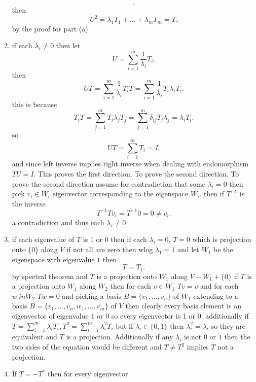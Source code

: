 \documentclass{article}
\begin{document}
\begin{enumerate}[label = (\alph*)]
\[                .\] 
                then
                \[
                U^2 = \lambda_1T_1 + ... + \lambda_mT_m = T
                .\] 
                by the proof for part (a)
            \item if each $\lambda_i \ne 0$ then let
                \[
                U = \sum_{i=1}^{m}\frac{1}{\lambda_i}T_i
                .\] 
                then
                \[
                UT = \sum_{i=1}^{m}\frac{1}{\lambda_i}T_iT = \sum_{i=1}^{m}\frac{1}{\lambda_i}T_i\lambda_iT_i
                .\] 
                this is because
                \[
                    T_iT = \sum_{j=1}^{m}T_i\lambda_jT_j = \sum_{j=1}^{m}\delta_{ij}T_i\lambda_j = \lambda_iT_i
                .\] 
                so
                \[
                UT = \sum_{i=1}^{m}T_i = I
                .\] 
                and since left inverse implies right inverse when dealing with endomorphism $TU = I$.
                This proves the first direction. To prove the second direction. To prove the second direction assume for contradiction that some $\lambda_i = 0$ then pick $v_i \in W_i$ eigenvector corresponding to the eigenspace  $W_i$.
                then if $T^{-1}$ is the inverse
                \[
                T^{-1}Tv_i = T^{-1}0 = 0 \ne v_i
                .\] 
                a contradiction and thus each $\lambda_i \ne 0$
            \item if each eigenvalue of $T$ is $1$ or $0$ then  if each $\lambda_i = 0$, $T = 0$ which is projection onto  $\{0\}$ along
                $V$ if not all are zero then wlog $\lambda_1 = 1$ and let $W_1$ be the eigenspace with eigenvalue $1$ then
                \[
                    T = T_1
                .\] 
                by spectral theorem and $T$ is a projection onto $W_1$ along $V - W_1 + \{0\}$
                if $T$ is a projection onto $W_1$ along $W_2$ then for each $v \in W_1$ $Tv  = v$ and for each  $w \ in W_2$ $Tw = 0$ and
                picking a basis $B = \{v_1,...,v_n\}$ of $W_1$ extending to a basis $B =\{v_1,...,v_n,w_1,...,v_m\}$ of $V$ then clearly 
                every basis element is an eigenvector of eigenvalue  $1$ or $0$ so every eigenvector is 1 or 0.
                additionally if $T = \sum_{i=1}^{m}\lambda_iT_i, T^2 = \sum_{i=1}^{m}\lambda_i^2T_i$ but if $\lambda_i \in \{0,1\}$ then $\lambda_i^2 = \lambda_i$ so they are equivalent and $T$ is a projection.
                Additionally if any $\lambda_i$ is not $0$ or $1$ then the two sides of the equation would be different and $T \ne T^2$ implies $T$ not a projection.
            \item If $T = -T^{*}$ then for every eigenvector

\end{enumerate}
\end{document}
